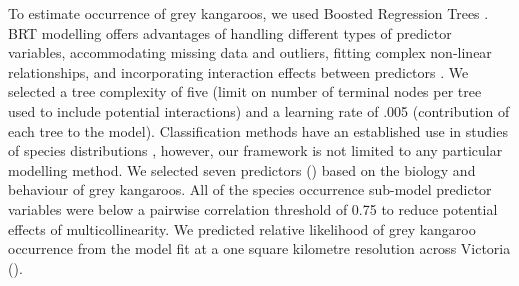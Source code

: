 To estimate occurrence of grey kangaroos, we used Boosted Regression Trees \citep[BRT, see][]{frie02}. BRT modelling offers advantages of handling different types of predictor variables, accommodating missing data and outliers, fitting complex non-linear relationships, and incorporating interaction effects between predictors \citep{elit08}. We selected a tree complexity of five (limit on number of terminal nodes per tree used to include potential interactions) and a learning rate of .005 (contribution of each tree to the model). Classification methods have an established use in studies of species distributions \citep[see][]{walk90,skid96}, however, our framework is not limited to any particular modelling method. We selected seven predictors () based on the biology and behaviour of grey kangaroos. All of the species occurrence sub-model predictor variables were below a pairwise correlation threshold of 0.75 to reduce potential effects of multicollinearity. We predicted relative likelihood of grey kangaroo occurrence from the model fit at a one square kilometre resolution across Victoria ().

